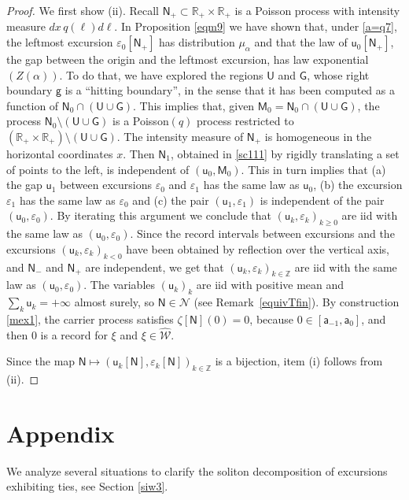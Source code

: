 \documentclass[12pt]{article}
\numberwithin{equation}{section}
\newcommand{\RR}{\mathbb R}
\newcommand{\ZZ}{\mathbb Z}
\newcommand{\cN}{\mathcal N}
\newcommand{\cW}{\mathcal W}
\newcommand{\sG}{\mathsf{G}}
\newcommand{\sM}{\mathsf{M}}
\newcommand{\sN}{\mathsf{N}}
\newcommand{\sU}{{\mathsf{U}}}
\newcommand{\sa}{{\mathsf{a}}}
\newcommand{\sg}{\mathsf{g}}
\newcommand{\su}{{\mathsf{u}}}
\newcommand{\hcW}{\widehat{\cW}}
\newcommand{\vep}{\varepsilon}
\begin{document}
\begin{proof}
	We first show (ii). Recall $\sN_+\subset \RR_+\times\RR_+$ is a Poisson process with intensity measure $dx\, q(\ell)d\ell$. In Proposition \ref{eqm9} we have shown that, under \eqref{a=q7}, the leftmost excursion $\vep_0[\sN_+]$ has distribution $\mu_\alpha$ and that the law of $\su_0[\sN_+]$, the gap between the origin and the leftmost excursion, has law exponential$(Z(\alpha))$. To do that, we have explored the regions $\sU$ and $\sG$, whose right boundary $\sg$ is a ``hitting boundary'', in the sense that it has been computed as a function of $\sN_0\cap (\sU\cup\sG)$. This implies that, given $\sM_0=\sN_0\cap(\sU\cup\sG)$, the process $\sN_0\setminus(\sU\cup\sG)$ is a Poisson$(q)$ process restricted to $(\RR_+\times\RR_+)\setminus(\sU\cup\sG)$. The intensity measure of $\sN_+$ is homogeneous in the horizontal coordinates $x$. Then $\sN_1$, obtained in \eqref{sc111} by rigidly translating a set of points to the left, is independent of $(\su_0, \sM_0)$. This in turn implies that (a) the gap $\su_1$ between excursions $\vep_0$ and $\vep_1$ has the same law as $\su_0$, (b) the excursion $\vep_1$ has the same law as $\vep_0$ and (c) the pair $(\su_1, \vep_1)$ is independent of the pair $(\su_0, \vep_0)$. By iterating this argument we conclude that $(\su_k, \vep_k)_{k\ge0}$ are iid with the same law as $(\su_0, \vep_0)$. Since the record intervals between excursions and the excursions $(\su_k, \vep_k)_{k<0}$ have been obtained by reflection over the vertical axis, and $\sN_-$ and $\sN_+$ are independent, we get that $(\su_k, \vep_k)_{k\in\ZZ}$ are iid with the same law as $(\su_0, \vep_0)$. The variables $(\su_k)_k$ are iid with positive mean and $\sum_k \su_k=+\infty$ almost surely, so $\sN\in \cN$ (see Remark~\ref{equivTfin}). By construction \eqref{mex1}, the carrier process satisfies $\zeta[\sN](0)=0$, because $0\in[\sa_{-1}, \sa_0]$, and then $0$ is a record for $\xi$ and $\xi\in\hcW$. 
	
	Since the map $\sN\mapsto (\su_k[\sN], \vep_k[\sN])_{k\in\ZZ}$ is a bijection, item (i) follows from (ii).
\end{proof}


\section{Appendix}
\label{appendix}

We analyze several situations to clarify the soliton decomposition of excursions exhibiting ties, see Section \ref{siw3}.
\end{document}
